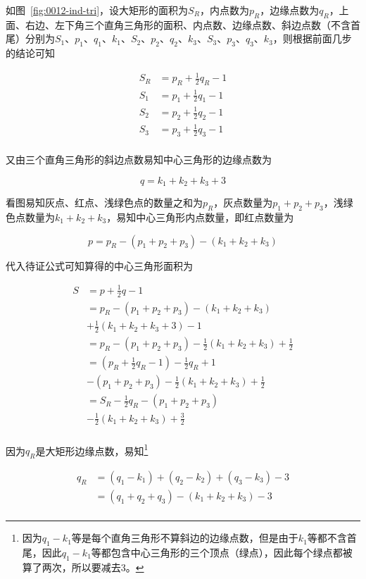 如图~\ref{fig:0012-ind-tri}，设大矩形的面积为$S_R$，内点数为$p_R$，边缘点数为$q_R$，上面、右边、左下角三个直角三角形的面积、内点数、边缘点数、斜边点数（不含首尾）分别为$S_1$、$p_1$、$q_1$、$k_1$、$S_2$、$p_2$、$q_2$、$k_3$、$S_3$、$p_3$、$q_3$、$k_3$，则根据前面几步的结论可知

\begin{align*}
  S_R &= p_R + \frac12q_R - 1 \\
  S_1 &= p_1 + \frac12q_1 - 1 \\
  S_2 &= p_2 + \frac12q_2 - 1 \\
  S_3 &= p_3 + \frac12q_3 - 1 \\
\end{align*}

又由三个直角三角形的斜边点数易知中心三角形的边缘点数为

\[ q = k_1 + k_2 + k_3 + 3 \]

看图易知灰点、红点、浅绿色点的数量之和为$p_R$，灰点数量为$p_1 + p_2 + p_3$，浅绿色点数量为$k_1 + k_2 + k_3$，易知中心三角形内点数量，即红点数量为

\[ p = p_R - (p_1 + p_2 + p_3) - (k_1 + k_2 + k_3) \]

代入待证公式可知算得的中心三角形面积为

\begin{align*}
  S &= p + \frac12q - 1 \\
  &= p_R - (p_1 + p_2 + p_3) - (k_1 + k_2 + k_3) \\
  &+ \frac12(k_1 + k_2 + k_3 + 3) - 1 \\
  &= p_R - (p_1 + p_2 + p_3) - \frac12(k_1 + k_2 + k_3) + \frac12 \\
  &= (p_R + \frac12q_R - 1) - \frac12q_R + 1 \\
  &- (p_1 + p_2 + p_3) - \frac12(k_1 + k_2 + k_3) + \frac12 \\
  &= S_R - \frac12q_R - (p_1 + p_2 + p_3) \\
  &- \frac12(k_1 + k_2 + k_3) + \frac32 \\
\end{align*}

因为$q_R$是大矩形边缘点数，易知\footnote{因为$q_1 - k_1$等是每个直角三角形不算斜边的边缘点数，但是由于$k_1$等都不含首尾，因此$q_1 - k_1$等都包含中心三角形的三个顶点（绿点），因此每个绿点都被算了两次，所以要减去3。}

\begin{align*}
  q_R &= (q_1 - k_1) + (q_2 - k_2) + (q_3 - k_3) - 3 \\
  &= (q_1 + q_2 + q_3) - (k_1 + k_2 + k_3) - 3 \\
\end{align*}

